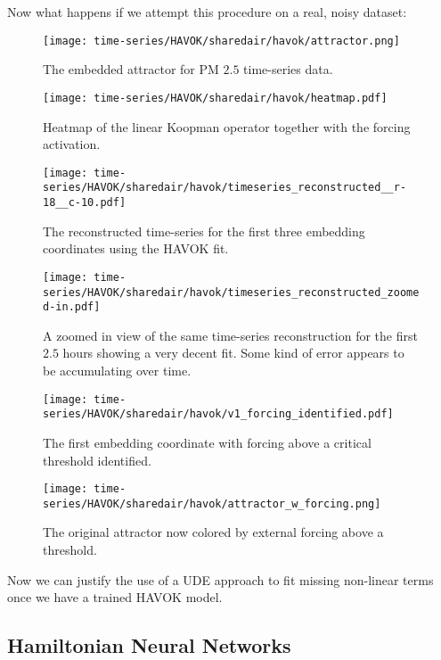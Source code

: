 Now what happens if we attempt this procedure on a real, noisy dataset:



\begin{figure}[h]
  \centering
  \texttt{[image: time-series/HAVOK/sharedair/havok/attractor.png]}
  \caption{The embedded attractor for PM $2.5$ time-series data.}
\end{figure}


\begin{figure}[h]
  \centering
  \texttt{[image: time-series/HAVOK/sharedair/havok/heatmap.pdf]}
  \caption{Heatmap of the linear Koopman operator together with the forcing activation.}
\end{figure}


\begin{figure}[h]
  \centering
  \texttt{[image: time-series/HAVOK/sharedair/havok/timeseries\_reconstructed\_\_r-18\_\_c-10.pdf]}
  \caption{The reconstructed time-series for the first three embedding coordinates using the HAVOK fit.}
\end{figure}

\begin{figure}[h]
  \centering
  \texttt{[image: time-series/HAVOK/sharedair/havok/timeseries\_reconstructed\_zoomed-in.pdf]}
  \caption{A zoomed in view of the same time-series reconstruction for the first $2.5$ hours showing a very decent fit. Some kind of error appears to be accumulating over time.}
\end{figure}

\begin{figure}[h]
  \centering
  \texttt{[image: time-series/HAVOK/sharedair/havok/v1\_forcing\_identified.pdf]}
  \caption{The first embedding coordinate with forcing above a critical threshold identified.}
\end{figure}

\begin{figure}[h]
  \centering
  \texttt{[image: time-series/HAVOK/sharedair/havok/attractor\_w\_forcing.png]}
  \caption{The original attractor now colored by external forcing above a threshold.}
\end{figure}


Now we can justify the use of a UDE approach to fit missing non-linear terms once we have a trained HAVOK model.



\subsection{Hamiltonian Neural Networks}

